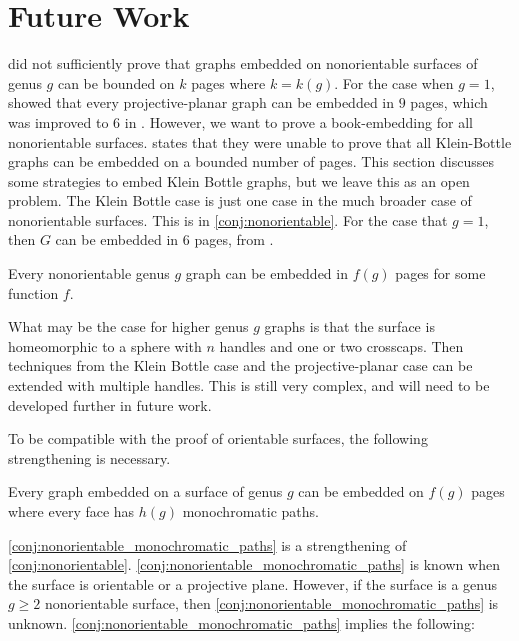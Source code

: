 
\section{Future Work}

\textcite{heathEmbeddingPlanarGraphs1984} did not sufficiently prove that graphs embedded on nonorientable surfaces of genus $g$ can be bounded on $k$ pages where $k = k(g)$. For the case when $g = 1$, \textcite{nakamotoBookEmbeddingProjectiveplanar2015} showed that every projective-planar graph can be embedded in $9$ pages, which was improved to 6 in \textcite{ozekiBookEmbeddingGraphs2019}. However, we want to prove a book-embedding for all nonorientable surfaces. 
\textcite{ozekiBookEmbeddingGraphs2019} states that they were unable to prove that all Klein-Bottle graphs can be embedded on a bounded number of pages. This section discusses some strategies to embed Klein Bottle graphs, but we leave this as an open problem. The Klein Bottle case is just one case in the much broader case of nonorientable surfaces. This is in \cref{conj:nonorientable}. For the case that $g = 1$, then $G$ can be embedded in 6 pages, from \textcite{ozekiBookEmbeddingGraphs2019}. 
\begin{conjecture}\label{conj:nonorientable}
	Every nonorientable genus $g$ graph can be embedded in $f(g)$ pages for some function $f$. 
\end{conjecture}

What may be the case for higher genus $g$ graphs is that the surface is homeomorphic to a sphere with $n$ handles and one or two crosscaps. Then techniques from the Klein Bottle case and the projective-planar case can be extended with multiple handles. This is still very complex, and will need to be developed further in future work.

To be compatible with the proof of orientable surfaces, the following strengthening is necessary. 
\begin{conjecture}\label{conj:nonorientable_monochromatic_paths}
	Every graph embedded on a surface of genus $g$ can be embedded on $f(g)$ pages where every face has $h(g)$ monochromatic paths. 
\end{conjecture}

\cref{conj:nonorientable_monochromatic_paths} is a strengthening of \cref{conj:nonorientable}. \cref{conj:nonorientable_monochromatic_paths} is known when the surface is orientable or a projective plane. However, if the surface is a genus $g \geq 2$ nonorientable surface, then \cref{conj:nonorientable_monochromatic_paths} is unknown. 
\cref{conj:nonorientable_monochromatic_paths} implies the following:

